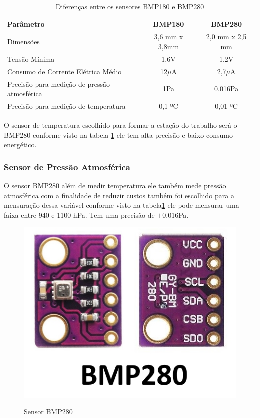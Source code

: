 \begin{table}[!h]
\centering
\begin{tabular}{|l|c|c|}
\hline
\textbf{Parâmetro}                           & \textbf{BMP180} & \textbf{BMP280} \\ \hline
Dimensões                                    & 3,6 mm x 3,8mm  & 2,0 mm x 2,5 mm \\ \hline
Tensão Mínima                                & 1,6V            & 1,2V            \\ \hline
Consumo de Corrente Elétrica Médio           & 12$\mu$A         & 2,7$\mu$A        \\ \hline
Precisão para medição de pressão atmosférica & 1Pa             & 0.016Pa         \\ \hline
Precisão para medição de temperatura         & 0,1 ºC          & 0,01 ºC         \\ \hline
\end{tabular}
\caption{Diferenças entre os sensores BMP180 e BMP280}
\label{tab:tablebmp}
\end{table}

O sensor de temperatura escolhido para formar a estação do trabalho será o BMP280 conforme visto na tabela \ref{tab:tablebmp} ele tem alta precisão e baixo consumo energético.

\subsubsection{Sensor de Pressão Atmosférica}

O sensor BMP280 além de medir temperatura ele também mede pressão atmosférica com a finalidade de reduzir custos também foi escolhido para a mensuração dessa variável conforme visto na tabela\ref{tab:tablebmp} ele pode mensurar uma faixa entre 940 e 1100 hPa. Tem uma precisão de $\pm$0,016Pa.

\begin{figure} [!h]
    \centering
    \caption{Sensor BMP280}
    \includegraphics[scale=0.5]{Figuras/BMP280_Pinout.jpg}
    \label{fig:bmp280}
\end{figure}

